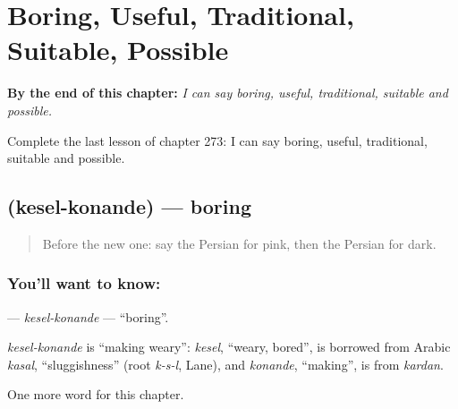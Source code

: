 
\chapter{Boring, Useful, Traditional, Suitable, Possible}
\label{ch:fa-boring-useful-traditional-suitable-possible}

\begin{chapteropening}
\textbf{By the end of this chapter:} \emph{I can say boring, useful, traditional, suitable and possible.}

Complete the last lesson of chapter 273: I can say boring, useful, traditional, suitable and possible.
\end{chapteropening}

\section[\texorpdfstring{\fa{کسل} \fa{کننده} (kesel-konande)}{کسل کننده (kesel-konande)}]{  (kesel-konande) — boring}

\label{lesson:FA-C273-kesel-konande}



\begin{quote}
Before the new one: say the Persian for pink, then the Persian for dark.
\end{quote}

\subsection*{You'll want to know:  }
\textbf{ } — \emph{kesel-konande} — \textquotedblleft{}boring\textquotedblright{}.

\begin{cousinweb}
\emph{kesel-konande} is \textquotedblleft{}making weary\textquotedblright{}: \emph{kesel}, \textquotedblleft{}weary, bored\textquotedblright{}, is borrowed from Arabic \emph{kasal}, \textquotedblleft{}sluggishness\textquotedblright{} (root \emph{k-s-l}, Lane), and \emph{konande}, \textquotedblleft{}making\textquotedblright{}, is from \emph{kardan}.
\end{cousinweb}

\begin{grammarlens}[title={What you've built}]
One more word for this chapter.
\end{grammarlens}

